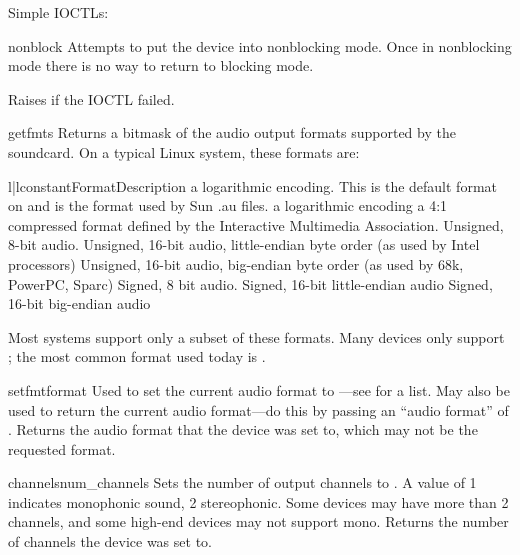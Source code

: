 Simple IOCTLs:

\begin{methoddesc}{nonblock}{}
Attempts to put the device into nonblocking mode.  Once in nonblocking
mode there is no way to return to blocking mode.

Raises  if the IOCTL failed.
\end{methoddesc}

\begin{methoddesc}{getfmts}{}
Returns a bitmask of the audio output formats supported by the
soundcard.  On a typical Linux system, these formats are:

\begin{tableii}{l|l}{constant}{Format}{Description}
       {a logarithmic encoding.  This is the default format on
         and is the format used by Sun .au files.}
       {a logarithmic encoding}
       {a 4:1 compressed format defined by the Interactive Multimedia
        Association.} 
       {Unsigned, 8-bit audio.}
       {Unsigned, 16-bit audio, little-endian byte order (as used by
        Intel processors)}
       {Unsigned, 16-bit audio, big-endian byte order (as used by 68k,
        PowerPC, Sparc)}
       {Signed, 8 bit audio.}
       {Signed, 16-bit little-endian audio}
       {Signed, 16-bit big-endian audio}
\end{tableii}
Most systems support only a subset of these formats.  Many devices only
support ; the most common format used today is
.
\end{methoddesc}

\begin{methoddesc}{setfmt}{format}
Used to set the current audio format to ---see
 for a list.  May also be used to return the current
audio format---do this by passing an ``audio format'' of
. Returns the audio format that the device was set
to, which may not be the requested format.
\end{methoddesc}

\begin{methoddesc}{channels}{num_channels}
Sets the number of output channels to .  A value of 1
indicates monophonic sound, 2 stereophonic.  Some devices may have more
than 2 channels, and some high-end devices may not support mono.
Returns the number of channels the device was set to.
\end{methoddesc}

